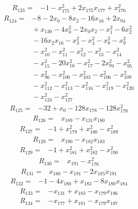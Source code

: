 \begin{align*}
R_{123} ={}& -1 - x_{175}^{2} + 2x_{175} x_{177} + x_{176}^{2}
\end{align*}
\begin{align*}
R_{124} ={}& -8 - 2x_{0} - 8x_{2} - 16x_{16} + 2x_{94} \\
&{} + x_{130} - 4x_{0}^{2} - 2x_{0} x_{2} - x_{1}^{2} - 6x_{2}^{2} \\
&{} -16x_{2} x_{16} - x_{3}^{2} - x_{4}^{2} - x_{8}^{2} - x_{9}^{2} \\
&{} -x_{10}^{2} - x_{11}^{2} - x_{12}^{2} - x_{13}^{2} - x_{14}^{2} \\
&{} -x_{15}^{2} - 20x_{16}^{2} - x_{17}^{2} - 2x_{94}^{2} - x_{95}^{2} \\
&{} -x_{96}^{2} - x_{100}^{2} - x_{103}^{2} - x_{106}^{2} - x_{109}^{2} \\
&{} -x_{112}^{2} - x_{113}^{2} - x_{116}^{2} - x_{119}^{2} - x_{120}^{2} \\
&{} -x_{124}^{2} - x_{127}^{2}
\end{align*}
\begin{align*}
R_{125} ={}& -32 + x_{0} - 128x_{178} - 128x_{178}^{2}
\end{align*}
\begin{align*}
R_{126} ={}& x_{189} - x_{131} x_{180}
\end{align*}
\begin{align*}
R_{127} ={}& -1 + x_{179}^{2} + x_{180}^{2} - x_{189}^{2}
\end{align*}
\begin{align*}
R_{128} ={}& x_{190} - x_{182} x_{183}
\end{align*}
\begin{align*}
R_{129} ={}& -1 + x_{181}^{2} + x_{182}^{2} - x_{190}^{2}
\end{align*}
\begin{align*}
R_{130} ={}& x_{191} - x_{176}^{2}
\end{align*}
\begin{align*}
R_{131} ={}& x_{180} - x_{191} - 2x_{185} x_{191}
\end{align*}
\begin{align*}
R_{132} ={}& -1 - 4x_{180} + x_{183} - 8x_{180} x_{184}
\end{align*}
\begin{align*}
R_{133} ={}& -x_{131} + x_{183} - x_{179} x_{186}
\end{align*}
\begin{align*}
R_{134} ={}& -x_{177} + x_{181} - x_{179} x_{187}
\end{align*}
